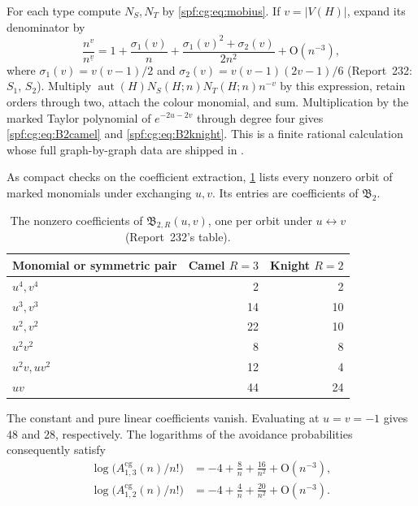 \documentclass[11pt]{article}
\numberwithin{equation}{section}
\theoremstyle{definition}
\theoremstyle{remark}
\theoremstyle{definition}
\newcommand{\fall}[2]{{#1}^{\underline{#2}}}
\newcommand{\bigO}{\mathrm O}
\begin{document}
For each type compute $N_S,N_T$ by \eqref{spf:cg:eq:mobius}. If $v=|V(H)|$,
expand its denominator by
\begin{equation}
 \frac{n^v}{\fall nv}=1+\frac{\sigma_1(v)}n+
 \frac{\sigma_1(v)^2+\sigma_2(v)}{2n^2}+\bigO(n^{-3}),
 \label{spf:cg:eq:den2}
\end{equation}
where $\sigma_1(v)=v(v-1)/2$ and $\sigma_2(v)=v(v-1)(2v-1)/6$ (Report~232:
$S_1$, $S_2$). Multiply
$\operatorname{aut}(H)N_S(H;n)N_T(H;n)n^{-v}$ by this expression, retain
orders through two, attach the colour monomial, and sum. Multiplication by
the marked Taylor polynomial of $e^{-2u-2v}$ through degree four gives
\eqref{spf:cg:eq:B2camel} and \eqref{spf:cg:eq:B2knight}. This is a finite
rational calculation whose full graph-by-graph data are shipped in
.

As compact checks on the coefficient extraction, \cref{spf:cg:tab:B2} lists
every nonzero orbit of marked monomials under exchanging $u,v$. Its entries
are coefficients of $\mathfrak B_2$.
\begin{table}[htbp]
\centering\small
\begin{tabular}{lrr}
\toprule
Monomial or symmetric pair & Camel $R=3$ & Knight $R=2$\\
\midrule
$u^4,v^4$ &2&2\\
$u^3,v^3$ &14&10\\
$u^2,v^2$ &22&10\\
$u^2v^2$ &8&8\\
$u^2v,uv^2$ &12&4\\
$uv$ &44&24\\
\bottomrule
\end{tabular}
\caption{The nonzero coefficients of $\mathfrak B_{2,R}(u,v)$, one per orbit
under $u\leftrightarrow v$ (Report~232's table).}
\label{spf:cg:tab:B2}
\end{table}
The constant and pure linear coefficients vanish. Evaluating at
$u=v=-1$ gives $48$ and $28$, respectively. The logarithms of the
avoidance probabilities consequently satisfy
\begin{equation}
 \begin{split}
 \log\bigl(A^{\mathrm{cg}}_{1,3}(n)/n!\bigr)&=-4+\frac8n+\frac{16}{n^2}+\bigO(n^{-3}),\\
 \log\bigl(A^{\mathrm{cg}}_{1,2}(n)/n!\bigr)&=-4+\frac4n+\frac{20}{n^2}+\bigO(n^{-3}).
 \end{split}
 \label{spf:cg:eq:logavoid}
\end{equation}
\end{document}

